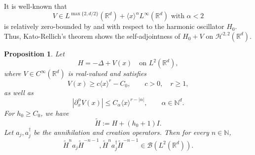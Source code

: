 \documentclass[11pt]{amsart}
\newcommand{\1}{\mathbbm{1}}
\theoremstyle{plain}
\newtheorem{proposition}[theorem]{Proposition}
\theoremstyle{definition}
\theoremstyle{remark}
\numberwithin{equation}{section}
\begin{document}
It is well-known that 
\[ V \in L^{\max\{2,d/2\}}(\mathbb R^d)+ \langle x \rangle^{\alpha} L^{\infty}(\mathbb R^d)\text{ with } \alpha<2\]
is relatively zero-bounded by \cite[Theorem X.15]{reed1975ii} and \cite[Theorem 4.28]{Zworski2012} with respect to the harmonic oscillator $H_0$. Thus, Kato-Rellich's theorem \cite[Theorem X.12]{reed1975ii} shows the self-adjointness of $H_0+V$ on $\mathcal H^{2,2}(\mathbb R^d).$


\begin{proposition}
Let
\[
H=-\Delta+V(x)
\quad\text{on }L^2(\mathbb R^d),
\]
where $V\in C^\infty(\mathbb R^d)$ is real-valued and satisfies
\[
V(x)\ge c\langle x\rangle^r-C_0,
\qquad c>0,\quad r\ge 1,
\]
as well as
\[
|\partial_x^\alpha V(x)|\le C_\alpha \langle x\rangle^{r-|\alpha|},
\qquad \alpha\in\mathbb N^d.
\]
For $h_0 \ge C_0$, we have 
\[
\widetilde H:=H+(h_0+1)I.
\]
Let $a_j,a_j^{\dagger}$ be the annihilation and creation operators.
Then for every $n\in\mathbb N$,
\[
\widetilde H^n a_j \widetilde H^{-n-1},\widetilde H^n a_j^{\dagger} \widetilde H^{-n-1}\in \mathcal B(L^2(\mathbb R^d)).
\]
\end{proposition}
\end{document}
